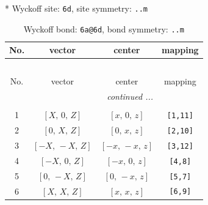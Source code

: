 \documentclass[fleqn,8pt]{jsarticle}
\begin{document}
* Wyckoff site: {\tt 6d}, site symmetry: {\tt ..m}
\renewcommand{\arraystretch}{1.2}
\begin{longtable}{cccc}
\caption{Wyckoff bond: {\tt 6a@6d}, bond symmetry: {\tt ..m}}
 \\
 \hline \hline
No. & vector & center & mapping \\ \hline \endfirsthead

\multicolumn{3}{l}{\tablename\ \thetable{}} \\
 \hline \hline
No. & vector & center & mapping \\ \hline \endhead

 \hline \hline
\multicolumn{3}{r}{\footnotesize\it continued ...} \\ \endfoot

 \hline \hline
\multicolumn{3}{r}{} \\ \endlastfoot

1 & $\left[ X,\, 0,\, Z \right]$ & $\left[ x,\, 0,\, z \right]$ & {\tt [1,11]} \\ \hline
2 & $\left[ 0,\, X,\, Z \right]$ & $\left[ 0,\, x,\, z \right]$ & {\tt [2,10]} \\ \hline
3 & $\left[ - X,\, - X,\, Z \right]$ & $\left[ - x,\, - x,\, z \right]$ & {\tt [3,12]} \\ \hline
4 & $\left[ - X,\, 0,\, Z \right]$ & $\left[ - x,\, 0,\, z \right]$ & {\tt [4,8]} \\ \hline
5 & $\left[ 0,\, - X,\, Z \right]$ & $\left[ 0,\, - x,\, z \right]$ & {\tt [5,7]} \\ \hline
6 & $\left[ X,\, X,\, Z \right]$ & $\left[ x,\, x,\, z \right]$ & {\tt [6,9]} \\
\end{longtable}
\renewcommand{\arraystretch}{1.2}
\end{document}
